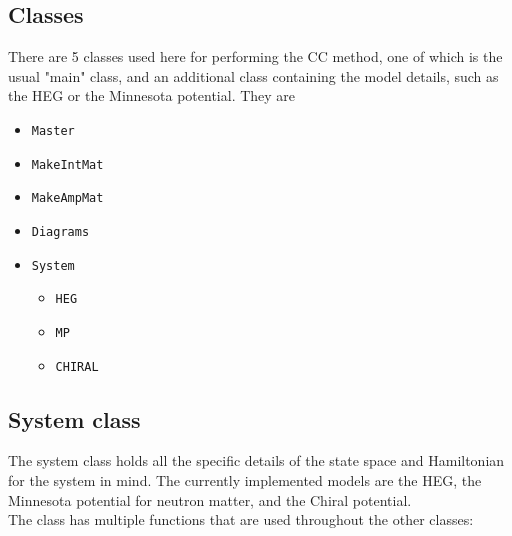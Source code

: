 \documentclass[10pt,twoside]{report}
\begin{document}
	\subsection{Classes}
	There are 5 classes used here for performing the CC method, one of which is the usual "main" class, and an additional class containing the model details, such as the HEG or the Minnesota potential. They are
	
	\begin{itemize}
		\item \texttt{Master}
		\item \texttt{MakeIntMat}
		\item \texttt{MakeAmpMat}
		\item \texttt{Diagrams}
		\item \texttt{System}
		\begin{itemize}
			\item \texttt{HEG}
			\item \texttt{MP}
			\item \texttt{CHIRAL}
		\end{itemize}
	\end{itemize}
	
	\subsection{System class}
	The system class holds all the specific details of the state space and Hamiltonian for the system in mind. The currently implemented models are the HEG, the Minnesota potential for neutron matter, and the Chiral potential.\\
	
	The class has multiple functions that are used throughout the other classes:
	
\end{document}
